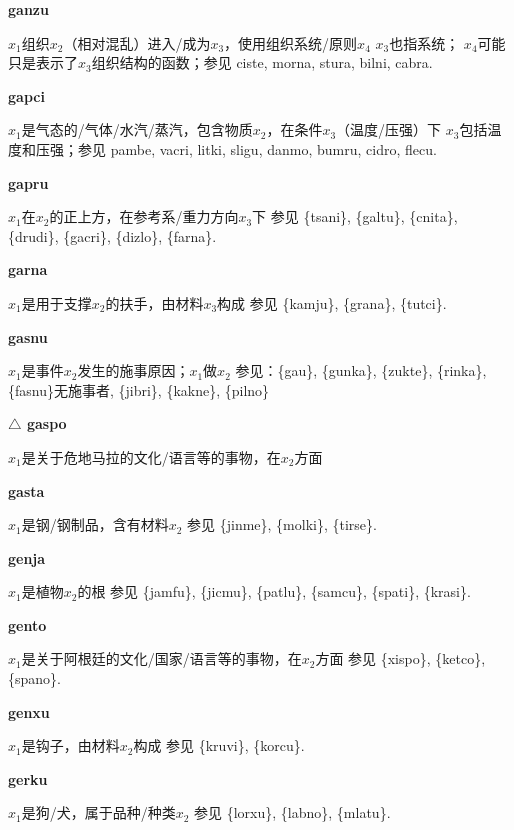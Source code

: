 \documentclass[notitlepage,twocolumn,a4paper,10pt]{book}
\begin{document}
{{\sffamily\bfseries ganzu}\enspace {\ttfamily\bfseries[gaz]}  $x_1$组织$x_2$（相对混乱）进入\slash{}成为$x_3$，使用组织系统\slash{}原则$x_4$ \textemdash{} $x_3$也指系统； $x_4$可能只是表示了$x_3$组织结构的函数；参见 {ciste}, {morna}, {stura}, {bilni}, {cabra}.

{\sffamily\bfseries gapci}\enspace {\ttfamily\bfseries[gac]}  $x_1$是气态的\slash{}气体\slash{}水汽\slash{}蒸汽，包含物质$x_2$，在条件$x_3$（温度\slash{}压强）下 \textemdash{} $x_3$包括温度和压强；参见 {pambe}, {vacri}, {litki}, {sligu}, {danmo}, {bumru}, {cidro}, {flecu}.

{\sffamily\bfseries gapru}\enspace {\ttfamily\bfseries[gap]}  $x_1$在$x_2$的正上方，在参考系\slash{}重力方向$x_3$下 \textemdash{} 参见 \{tsani\}, \{galtu\}, \{cnita\}, \{drudi\}, \{gacri\}, \{dizlo\}, \{farna\}.

{\sffamily\bfseries garna}\enspace {\ttfamily\bfseries[gar]}  $x_1$是用于支撑$x_2$的扶手，由材料$x_3$构成 \textemdash{} 参见 \{kamju\}, \{grana\}, \{tutci\}.

{\sffamily\bfseries gasnu}\enspace {\ttfamily\bfseries[        gau]}  $x_1$是事件$x_2$发生的施事原因；$x_1$做$x_2$ \textemdash{} 参见：\{gau\}, \{gunka\}, \{zukte\}, \{rinka\}, \{fasnu\}无施事者, \{jibri\}, \{kakne\}, \{pilno\}

{\sffamily\bfseries $\triangle$ gaspo} $x_1$是关于危地马拉的文化\slash{}语言等的事物，在$x_2$方面

{\sffamily\bfseries gasta}\enspace {\ttfamily\bfseries[gat]}  $x_1$是钢\slash{}钢制品，含有材料$x_2$ \textemdash{} 参见 \{jinme\}, \{molki\}, \{tirse\}.

{\sffamily\bfseries genja}\enspace {\ttfamily\bfseries[gej]}  $x_1$是植物$x_2$的根 \textemdash{} 参见 \{jamfu\}, \{jicmu\}, \{patlu\}, \{samcu\}, \{spati\}, \{krasi\}.

{\sffamily\bfseries gento}\enspace {\ttfamily\bfseries[get     ge'o]}  $x_1$是关于阿根廷的文化\slash{}国家\slash{}语言等的事物，在$x_2$方面 \textemdash{} 参见 \{xispo\}, \{ketco\}, \{spano\}.

{\sffamily\bfseries genxu}\enspace {\ttfamily\bfseries[gex]}  $x_1$是钩子，由材料$x_2$构成 \textemdash{} 参见 \{kruvi\}, \{korcu\}.

{\sffamily\bfseries gerku}\enspace {\ttfamily\bfseries[ger     ge'u]}  $x_1$是狗\slash{}犬，属于品种\slash{}种类$x_2$ \textemdash{} 参见 \{lorxu\}, \{labno\}, \{mlatu\}.

}
\end{document}
